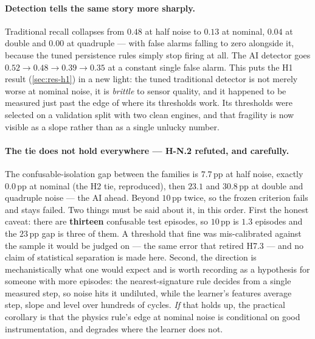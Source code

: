 \paragraph{Detection tells the same story more sharply.} Traditional recall collapses from
$0.48$ at half noise to $0.13$ at nominal, $0.04$ at double and $0.00$ at quadruple --- with
false alarms falling to zero alongside it, because the tuned persistence rules simply stop
firing at all. The AI detector goes $0.52 \to 0.48 \to 0.39 \to 0.35$ at a constant single
false alarm. This puts the H1 result (\cref{sec:res-h1}) in a new light: the tuned traditional
detector is not merely worse at nominal noise, it is \emph{brittle} to sensor quality, and it
happened to be measured just past the edge of where its thresholds work. Its thresholds were
selected on a validation split with two clean engines, and that fragility is now visible as a
slope rather than as a single unlucky number.

\paragraph{The tie does not hold everywhere --- H-N.2 refuted, and carefully.} The
confusable-isolation gap between the families is $7.7$\,pp at half noise, exactly $0.0$\,pp at
nominal (the H2 tie, reproduced), then $23.1$ and $30.8$\,pp at double and quadruple noise ---
the AI ahead. Beyond $10$\,pp twice, so the frozen criterion fails and stays failed. Two things
must be said about it, in this order. First the honest caveat: there are \textbf{thirteen}
confusable test episodes, so $10$\,pp is $1.3$ episodes and the $23$\,pp gap is three of them.
A threshold that fine was mis-calibrated against the sample it would be judged on --- the same
error that retired H7.3 --- and no claim of statistical separation is made here. Second, the
direction is mechanistically what one would expect and is worth recording as a hypothesis for
someone with more episodes: the nearest-signature rule decides from a single measured step, so
noise hits it undiluted, while the learner's features average step, slope and level over
hundreds of cycles. \emph{If} that holds up, the practical corollary is that the physics rule's
edge at nominal noise is conditional on good instrumentation, and degrades where the learner
does not.

